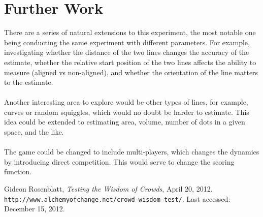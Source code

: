 \documentclass[12pt]{article}
\begin{document}
\section{Further Work}\label{further work}
There are a series of natural extensions to this experiment, the most notable one being conducting the same experiment with different parameters. For example, investigating whether the distance of the two lines changes the accuracy of the estimate, whether the relative start position of the two lines affects the ability to measure (aligned vs non-aligned), and whether the orientation of the line matters to the estimate. 
\\\\Another interesting area to explore would be other types of lines, for example, curves or random squiggles, which would no doubt be harder to estimate. This idea could be extended to estimating area, volume, number of dots in a given space, and the like. 
\\\\The game could be changed to include multi-players, which changes the dynamics by introducing direct competition. This would serve to change the scoring function. 




\begin{thebibliography}{10}
 Gideon Rosenblatt, \emph{Testing the Wisdom of Crowds}, April 20, 2012. \texttt{http://www.alchemyofchange.net/crowd-wisdom-test/}. Last accessed: December 15, 2012. 

\end{thebibliography}
\end{document}
